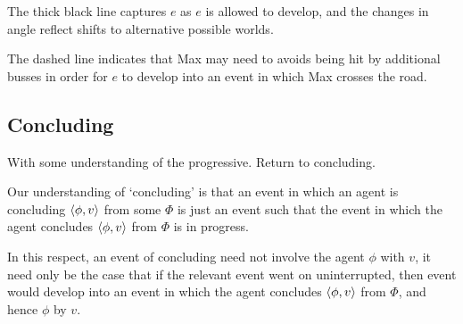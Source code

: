 \begin{note}
  The thick black line captures \(e\) as \(e\) is allowed to develop, and the changes in angle reflect shifts to alternative possible worlds.

  The dashed line indicates that Max may need to avoids being hit by additional busses in order for \(e\) to develop into an event in which Max crosses the road.

  
\end{note}

\subsection{Concluding}

\begin{note}
  With some understanding of the progressive.
  Return to concluding.
\end{note}

\begin{note}
  Our understanding of `concluding' is that an event in which an agent is concluding \(\langle \phi, v \rangle\) from some \pool{} \(\Phi\) is just an event such that the event in which the agent concludes \(\langle \phi, v \rangle\) from \(\Phi\) is in progress.

  In this respect, an event of concluding need not involve the agent \evaling{} \(\phi\) with \(v\), it need only be the case that if the relevant event went on uninterrupted, then event would develop into an event in which the agent concludes \(\langle \phi, v \rangle\) from \(\Phi\), and hence  \(\phi\) by \(v\).
\end{note}

